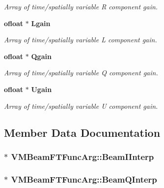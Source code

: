 \begin{CompactItemize}
\begin{CompactList}\small\item\em Array of time/spatially variable R component gain. \item\end{CompactList}\item 
{\bf ofloat} $\ast$ {\bf Lgain}
\begin{CompactList}\small\item\em Array of time/spatially variable L component gain. \item\end{CompactList}\item 
{\bf ofloat} $\ast$ {\bf Qgain}
\begin{CompactList}\small\item\em Array of time/spatially variable Q component gain. \item\end{CompactList}\item 
{\bf ofloat} $\ast$ {\bf Ugain}
\begin{CompactList}\small\item\em Array of time/spatially variable U component gain. \item\end{CompactList}\end{CompactItemize}


\subsection{Member Data Documentation}
\subsubsection{$\ast$ {\bf VMBeam\-FTFunc\-Arg::Beam\-IInterp}}\label{structVMBeamFTFuncArg_o8}


\subsubsection{$\ast$ {\bf VMBeam\-FTFunc\-Arg::Beam\-QInterp}}\label{structVMBeamFTFuncArg_o10}


